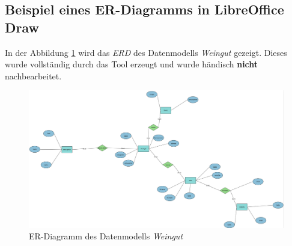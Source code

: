\subsection{Beispiel eines ER-Diagramms in LibreOffice Draw}
\hon{}

In der Abbildung \ref{LODERD} wird das \textit{ERD} des Datenmodells \textit{Weingut} gezeigt. Dieses wurde vollständig durch das Tool erzeugt und wurde händisch \textbf{nicht} nachbearbeitet.

\begin{figure}[H]
	\begin{center}
		\includegraphics[width=14cm]{images/20.png}
		\caption{ER-Diagramm des Datenmodells \textit{Weingut}}
		\label{LODERD}
	\end{center}
\end{figure}